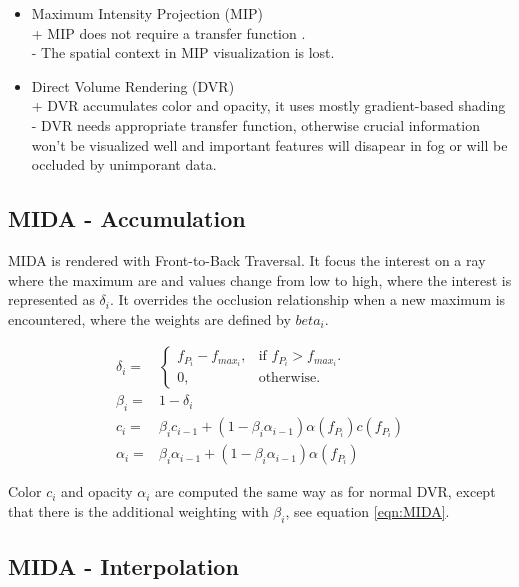 \begin{itemize}
\item Maximum Intensity Projection (MIP) \\
+ MIP does not require a transfer function .\\
- The spatial context in MIP visualization is lost. \\
\item Direct Volume Rendering (DVR)\\
+ DVR accumulates color and opacity, it uses mostly gradient-based shading \\
- DVR needs appropriate transfer function, otherwise crucial information won't be visualized well 
  and important features will disapear in fog or will be occluded by unimporant data.
\end{itemize}

\subsection{MIDA - Accumulation}

MIDA is rendered with Front-to-Back Traversal. 
It focus the interest on a ray where the maximum are and values change from low to high, where the interest is represented as $\delta_i$.
It overrides the occlusion relationship when a new maximum is encountered, where the weights are defined by $beta_i$.

\begin{eqnarray}
\delta_i = & \begin{cases}
f_{P_i} - f_{max_i}, & \text{if $f_{P_i} > f_{max_i}$}.\\
0, & \text{otherwise}.
\end{cases} \\
\beta_i = & 1 - \delta_i \\
c_i = & \beta_i c_{i-1} + (1 - \beta_i \alpha_{i-1}) \alpha(f_{P_i})c(f_{P_i}) \\
\alpha_i = & \beta_i \alpha_{i-1} + (1 - \beta_i \alpha_{i-1}) \alpha(f_{P_i}) 
\label{eqn:MIDA}
\end{eqnarray}

Color $c_i$ and opacity $\alpha_i$ are computed the same way as for normal DVR, except that there is the additional weighting with $\beta_i$, see equation \eqref{eqn:MIDA}.

\subsection{MIDA - Interpolation}

